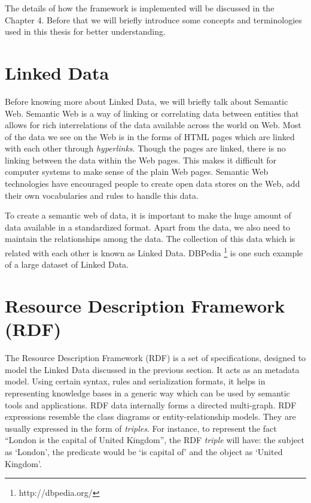 The details of how the framework is implemented will be discussed in the Chapter 4. Before that we will briefly introduce some concepts and terminologies used in this thesis for better understanding.

\section{Linked Data}

Before knowing more about Linked Data, we will briefly talk about Semantic Web. Semantic Web is a way of linking or correlating data between entities that allows for rich interrelations of the data available across the world on Web. Most of the data we see on the Web is in the forms of HTML pages which are linked with each other through \textit{hyperlinks}. Though the pages are linked, there is no linking between the data within the Web pages. This makes it difficult for computer systems to make sense of the plain Web pages. Semantic Web technologies have encouraged people to create open data stores on the Web, add their own vocabularies and rules to handle this data.

To create a semantic web of data, it is important to make the huge amount of data available in a standardized format. Apart from the data, we also need to maintain the relationships among the data. The collection of this data which is related with each other is known as Linked Data. DBPedia \footnote{http://dbpedia.org/} is one such example of a large dataset of Linked Data.

\section{Resource Description Framework (RDF)}

The Resource Description Framework (RDF) is a set of specifications, designed to model the Linked Data discussed in the previous section. It acts as an metadata model. Using certain syntax, rules and serialization formats, it helps in representing knowledge bases in a generic way which can be used by semantic tools and applications. RDF data internally forms a directed multi-graph. RDF expressions resemble the class diagrams or entity-relationship models. They are usually expressed in the form of \textit{triples}. For instance, to represent the fact ``London is the capital of United Kingdom'', the RDF \textit{triple} will have: the subject as `London', the predicate would be `is capital of' and the object as `United Kingdom'.

